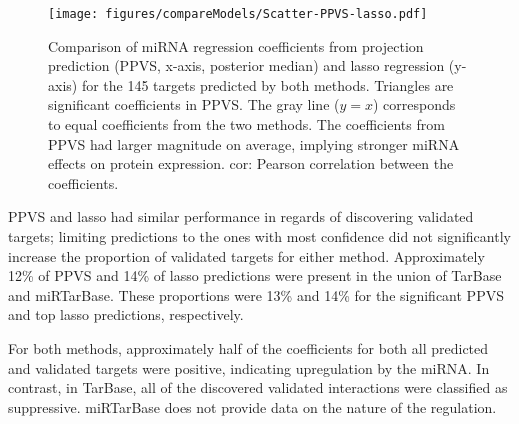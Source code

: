 \begin{figure}[htb]
  \centering
  \texttt{[image: figures/compareModels/Scatter-PPVS-lasso.pdf]}
  \caption{Comparison of miRNA regression coefficients from projection
  prediction (PPVS, x-axis, posterior median) and lasso regression (y-axis) for the 145 targets predicted by both methods.
  Triangles are significant coefficients in PPVS. The gray line ($y=x$) corresponds to
  equal coefficients from the two methods. The coefficients from PPVS had
  larger magnitude on average, implying stronger miRNA effects on protein expression.
  cor: Pearson correlation between the coefficients.
  }
  \label{fig:scatter-ppvs-lasso}
\end{figure}

PPVS and lasso had similar performance in regards of discovering validated
targets; limiting predictions to the ones with most confidence did not
significantly increase the proportion of validated targets for either method.
Approximately 12\% of PPVS and 14\% of lasso predictions were present in the
union of TarBase and miRTarBase. These proportions were 13\% and 14\% for the
significant PPVS and top lasso predictions, respectively.

For both methods, approximately half of the coefficients for both all
predicted and validated targets were positive, indicating upregulation by the
miRNA. In contrast, in TarBase, all of the discovered validated interactions
were classified as suppressive. miRTarBase does not provide data on the
nature of the regulation.
